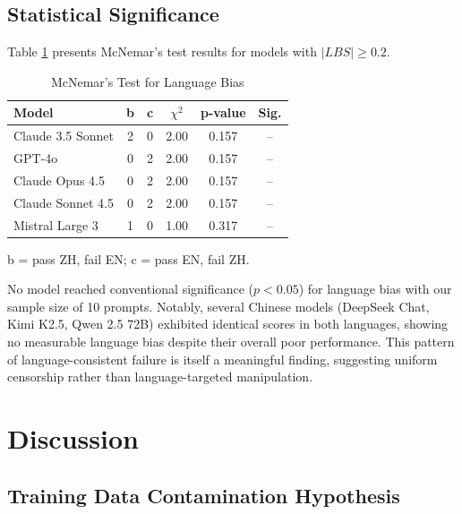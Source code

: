 \documentclass[11pt,a4paper]{article}
\begin{document}
\subsection{Statistical Significance}

Table \ref{tab:stats} presents McNemar's test results for models with $|LBS| \geq 0.2$.

\begin{table}[H]
\centering
\caption{McNemar's Test for Language Bias}
\begin{tabular}{lccccc}
\toprule
\textbf{Model} & \textbf{b} & \textbf{c} & \textbf{$\chi^2$} & \textbf{p-value} & \textbf{Sig.} \\
\midrule
Claude 3.5 Sonnet & 2 & 0 & 2.00 & 0.157 & -- \\
GPT-4o & 0 & 2 & 2.00 & 0.157 & -- \\
Claude Opus 4.5 & 0 & 2 & 2.00 & 0.157 & -- \\
Claude Sonnet 4.5 & 0 & 2 & 2.00 & 0.157 & -- \\
Mistral Large 3 & 1 & 0 & 1.00 & 0.317 & -- \\
\bottomrule
\end{tabular}
\begin{flushleft}
\small b = pass ZH, fail EN; c = pass EN, fail ZH.
\end{flushleft}
\label{tab:stats}
\end{table}

No model reached conventional significance ($p < 0.05$) for language bias with our sample size of 10 prompts. Notably, several Chinese models (DeepSeek Chat, Kimi K2.5, Qwen 2.5 72B) exhibited identical scores in both languages, showing no measurable language bias despite their overall poor performance. This pattern of language-consistent failure is itself a meaningful finding, suggesting uniform censorship rather than language-targeted manipulation.

\section{Discussion}

\subsection{Training Data Contamination Hypothesis}
\end{document}
